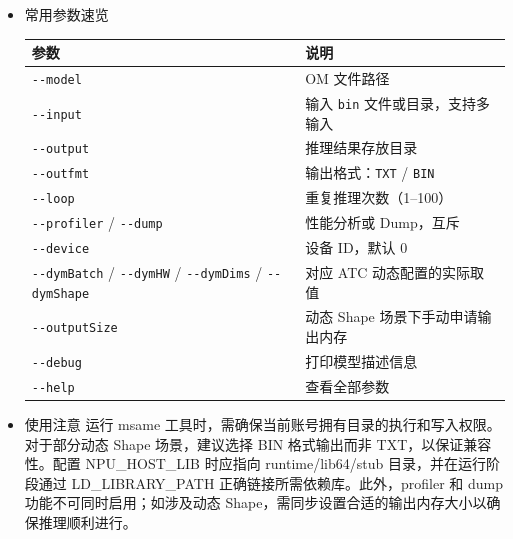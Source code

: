 \begin{itemize}
\item
  常用参数速览

  \begin{longtable}[]{@{}
    >{\raggedright\arraybackslash}p{}
    >{\raggedright\arraybackslash}p{}@{}}
  \toprule\noalign{}
  \begin{minipage}[b]{\linewidth}\raggedright
  参数
  \end{minipage} & \begin{minipage}[b]{\linewidth}\raggedright
  说明
  \end{minipage} \\
  \midrule\noalign{}
  \endhead
  \bottomrule\noalign{}
  \endlastfoot
  \passthrough{\lstinline!--model!} & OM 文件路径 \\
  \passthrough{\lstinline!--input!} & 输入 \passthrough{\lstinline!bin!}
  文件或目录，支持多输入 \\
  \passthrough{\lstinline!--output!} & 推理结果存放目录 \\
  \passthrough{\lstinline!--outfmt!} &
  输出格式：\passthrough{\lstinline!TXT!} /
  \passthrough{\lstinline!BIN!} \\
  \passthrough{\lstinline!--loop!} & 重复推理次数（1--100） \\
  \passthrough{\lstinline!--profiler!} /
  \passthrough{\lstinline!--dump!} & 性能分析或 Dump，互斥 \\
  \passthrough{\lstinline!--device!} & 设备 ID，默认 0 \\
  \passthrough{\lstinline!--dymBatch!} /
  \passthrough{\lstinline!--dymHW!} /
  \passthrough{\lstinline!--dymDims!} /
  \passthrough{\lstinline!--dymShape!} & 对应 ATC 动态配置的实际取值 \\
  \passthrough{\lstinline!--outputSize!} & 动态 Shape
  场景下手动申请输出内存 \\
  \passthrough{\lstinline!--debug!} & 打印模型描述信息 \\
  \passthrough{\lstinline!--help!} & 查看全部参数 \\
  \end{longtable}
\item
  使用注意 运行 msame
  工具时，需确保当前账号拥有目录的执行和写入权限。对于部分动态 Shape
  场景，建议选择 BIN 格式输出而非 TXT，以保证兼容性。配置 NPU\_HOST\_LIB
  时应指向 runtime/lib64/stub 目录，并在运行阶段通过 LD\_LIBRARY\_PATH
  正确链接所需依赖库。此外，profiler 和 dump
  功能不可同时启用；如涉及动态
  Shape，需同步设置合适的输出内存大小以确保推理顺利进行。
\end{itemize}

